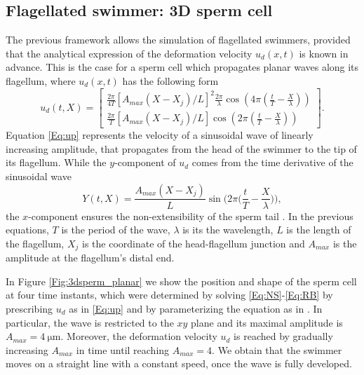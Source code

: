 \documentclass[graybox]{svmult}
\newcommand{\Vel}{u} %
\begin{document}
\subsection{Flagellated swimmer: 3D sperm cell}
The previous framework allows the simulation of flagellated swimmers, provided that the analytical expression of the deformation velocity $\Vel_d(x,t)$ is known in advance. This is the case for a sperm cell which propagates planar waves along its flagellum, where $\Vel_d(x,t)$ has the following form \cite{RazaviAhmadi2015}
\begin{equation}
	\Vel_d(t,X)=
	\begin{bmatrix}
		\frac{2\pi}{4T}[A_{max}(X-X_j)/L]^2\frac{2\pi}{\lambda}\cos(4\pi (\frac{t}{T}-\frac{X}{\lambda})) \\
		\frac{2\pi}{T}[A_{max}(X-X_j)/L]\cos(2\pi (\frac{t}{T}-\frac{X}{\lambda}))
	\end{bmatrix}.
	\label{Eq:up}
\end{equation}
Equation \eqref{Eq:up} represents the velocity of a sinusoidal wave of linearly increasing amplitude, that propagates from the head of the swimmer to the tip of its flagellum. 
While the $y$-component of $\Vel_d$ comes from the time derivative of the sinusoidal wave
\begin{equation*}
	Y(t,X) = \frac{A_{max}(X-X_j)}{L} \sin\Bigg(2\pi \Bigg(\frac{t}{T}-\frac{X}{\lambda}\Bigg)\Bigg),
\end{equation*}
the $x$-component ensures the non-extensibility of the sperm tail \cite{taylor_geoffrey_ingram_analysis_1951}. 
In the previous equations, $T$ is the period of the wave, $\lambda$ is its the wavelength, $L$ is the length of the flagellum, $X_j$ is the coordinate of the head-flagellum junction and $A_{max}$ is the amplitude at the flagellum's distal end.

In Figure \ref{Fig:3dsperm_planar} we show the position and shape of the sperm cell at four time instants, which were determined by solving \eqref{Eq:NS}-\eqref{Eq:RB} by prescribing $u_d$ as in \eqref{Eq:up} and by parameterizing the equation as in \cite{RazaviAhmadi2015}. In particular, the wave is restricted to the $xy$ plane and its maximal amplitude is $A_{max} = \SI{4}{\micro\meter}$. Moreover, the deformation velocity $\Vel_d$ is reached by gradually increasing $A_{max}$ in time until reaching $A_{max}=4$. We obtain that the swimmer moves on a straight line with a constant speed, once the wave is fully developed. 
\end{document}
